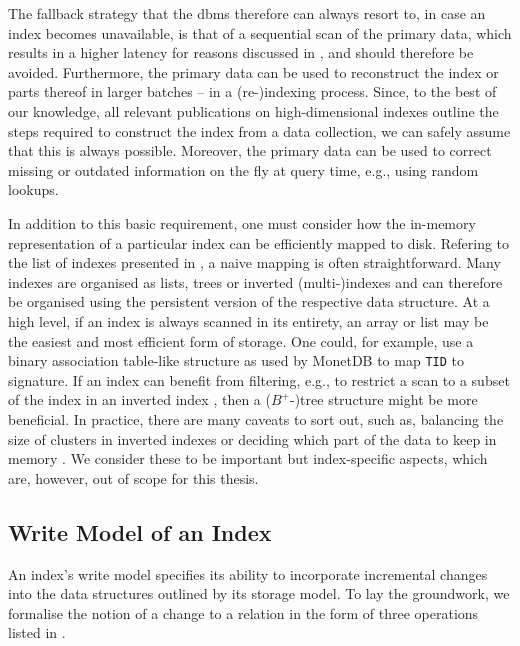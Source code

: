 The fallback strategy that the \acrshort{dbms} therefore can always resort to, in case an index becomes unavailable, is that of a sequential scan of the primary data, which results in a higher latency for reasons discussed in , and should therefore be avoided. Furthermore, the primary data can be used to reconstruct the index or parts thereof in larger batches -- in a (re-)indexing process. Since, to the best of our knowledge, all relevant publications on high-dimensional indexes outline the steps required to construct the index from a data collection, we can safely assume that this is always possible. Moreover, the primary data can be used to correct missing or outdated information on the fly at query time, e.g., using random lookups.

In addition to this basic requirement, one must consider how the in-memory representation of a particular index can be efficiently mapped to disk. Refering to the list of indexes presented in , a naive mapping is often straightforward. Many indexes are organised as lists, trees or inverted (multi-)indexes \cite{Sivic:2003Video,Babenko:2014Inverted} and can therefore be organised using the persistent version of the respective data structure. At a high level, if an index is always scanned in its entirety, an array or list may be the easiest and most efficient form of storage. One could, for example, use a binary association table-like structure as used by MonetDB \cite{Idreos:2012MonetDB} to map \texttt{TID} to signature. If an index can benefit from filtering, e.g., to restrict a scan to a subset of the index in an inverted index \cite{Chierichetti:2007Finding,Gudmundsson:2010Large,Jegou:2010Product}, then a ($B^{+}$-)tree structure might be more beneficial. In practice, there are many caveats to sort out, such as, balancing the size of clusters in inverted indexes \cite{Hojsgaard:2019Index} or deciding which part of the data to keep in memory \cite{Lejsek:2009NVTree,Jayaram:2019DiskANN,Chen:2021SPANN}. We consider these to be important but index-specific aspects, which are, however, out of scope for this thesis.

\subsection{Write Model of an Index}
An index's write model specifies its ability to incorporate incremental changes into the data structures outlined by its storage model. To lay the groundwork, we formalise the notion of a change to a relation in the form of three operations listed in . 

